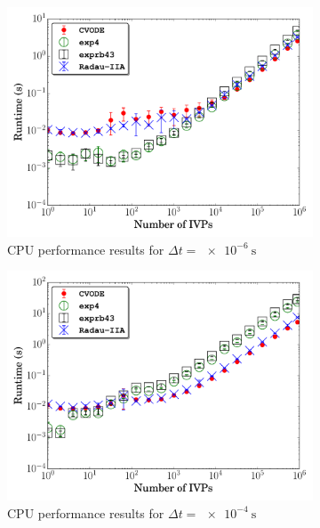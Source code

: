 \documentclass[preprint,review,11pt]{elsarticle}
\begin{document}
\begin{figure}[htbp]
  \centering
  \begin{subfigure}{0.49\textwidth}
      \includegraphics[width=\linewidth]{H2_1e-06_cpu_nonorm.pdf}
      \caption{CPU performance results for $\Delta t = \SI{e-6}{\second}$}
  \end{subfigure}
  \begin{subfigure}{0.49\textwidth}
      \includegraphics[width=\linewidth]{H2_1e-04_cpu_nonorm.pdf}
      \caption{CPU performance results for $\Delta t = \SI{e-4}{\second}$}
  \end{subfigure}\\
  \begin{subfigure}{0.49\textwidth}

\end{subfigure}
\end{figure}
\end{document}

